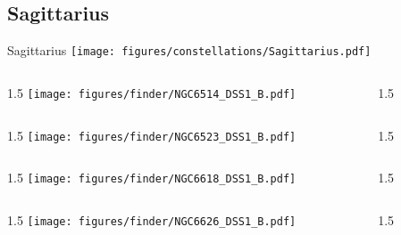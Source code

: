 \documentclass[final]{beamer}
\newlength{\colwidth}
\begin{document}
\subsection{Sagittarius}

\begin{frame}[t]{\LARGE Sagittarius}
  \centering
  \texttt{[image: figures/constellations/Sagittarius.pdf]}
\end{frame}


\begin{frame}[t]{}
  \begin{columns}[T]
    \begin{column}{1.5\colwidth}
      \centering
      \texttt{[image: figures/finder/NGC6514\_DSS1\_B.pdf]}
    \end{column}
    \begin{column}{1.5\colwidth}
      \Large
      
    \end{column}
  \end{columns}
  \vspace{\fill}
  \begin{columns}[T]
    \begin{column}{1.5\colwidth}
      \centering
      \texttt{[image: figures/finder/NGC6523\_DSS1\_B.pdf]}
    \end{column}
    \begin{column}{1.5\colwidth}
      \Large
      
    \end{column}
  \end{columns}
\end{frame}


\begin{frame}[t]{}
  \begin{columns}[T]
    \begin{column}{1.5\colwidth}
      \centering
      \texttt{[image: figures/finder/NGC6618\_DSS1\_B.pdf]}
    \end{column}
    \begin{column}{1.5\colwidth}
      \Large
      
    \end{column}
  \end{columns}
  \vspace{\fill}
  \begin{columns}[T]
    \begin{column}{1.5\colwidth}
      \centering
      \texttt{[image: figures/finder/NGC6626\_DSS1\_B.pdf]}
    \end{column}
    \begin{column}{1.5\colwidth}
      \Large
      
    \end{column}
  \end{columns}
\end{frame}
\end{document}
